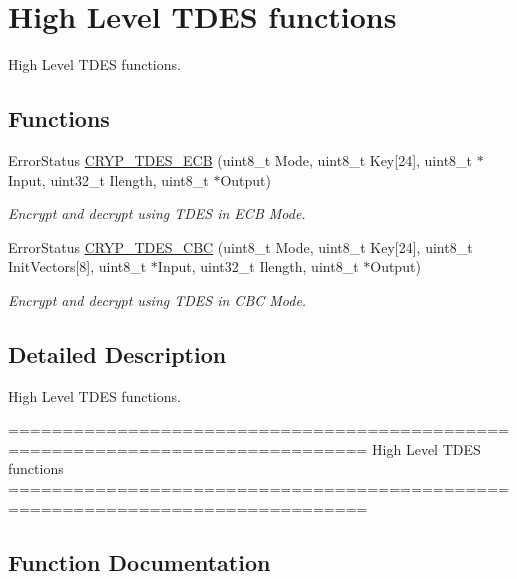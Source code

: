 \hypertarget{group___c_r_y_p___group7}{}\section{High Level T\+D\+E\+S functions}
\label{group___c_r_y_p___group7}


High Level T\+D\+E\+S functions.  


\subsection*{Functions}
\begin{DoxyCompactItemize}
\item 
Error\+Status \hyperlink{group___c_r_y_p___group7_ga17c03ab4f0566fcbc3dd8c052e6f9886}{C\+R\+Y\+P\+\_\+\+T\+D\+E\+S\+\_\+\+E\+C\+B} (uint8\+\_\+t Mode, uint8\+\_\+t Key\mbox{[}24\mbox{]}, uint8\+\_\+t $\ast$Input, uint32\+\_\+t Ilength, uint8\+\_\+t $\ast$Output)
\begin{DoxyCompactList}\small\item\em Encrypt and decrypt using T\+D\+E\+S in E\+C\+B Mode. \end{DoxyCompactList}\item 
Error\+Status \hyperlink{group___c_r_y_p___group7_gabe52a368c4882450c1e82f16bc1eb686}{C\+R\+Y\+P\+\_\+\+T\+D\+E\+S\+\_\+\+C\+B\+C} (uint8\+\_\+t Mode, uint8\+\_\+t Key\mbox{[}24\mbox{]}, uint8\+\_\+t Init\+Vectors\mbox{[}8\mbox{]}, uint8\+\_\+t $\ast$Input, uint32\+\_\+t Ilength, uint8\+\_\+t $\ast$Output)
\begin{DoxyCompactList}\small\item\em Encrypt and decrypt using T\+D\+E\+S in C\+B\+C Mode. \end{DoxyCompactList}\end{DoxyCompactItemize}


\subsection{Detailed Description}
High Level T\+D\+E\+S functions. 

\begin{DoxyVerb} ===============================================================================
                          High Level TDES functions
 ===============================================================================\end{DoxyVerb}
 

\subsection{Function Documentation}
\hypertarget{group___c_r_y_p___group7_gabe52a368c4882450c1e82f16bc1eb686}{}
